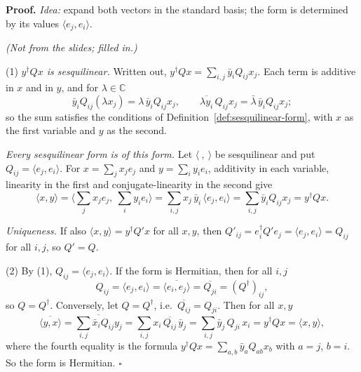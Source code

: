 \documentclass[11pt]{report}
\renewenvironment{proof}[1][Proof]{\noindent\textbf{#1.} }{\hfill$\square$\par\vspace{5pt}}
\begin{document}
\begin{proof}
\textit{Idea:} expand both vectors in the standard basis; the form is determined by its values $\langle e_j, e_i \rangle$.\par
\textit{(Not from the slides; filled in.)}

(1) \emph{$y^\dagger Q x$ is sesquilinear.} Written out, $y^\dagger Q x = \sum_{i,j} \bar y_i Q_{ij} x_j$. Each term is additive in $x$ and in $y$, and for $\lambda \in \mathbb{C}$
\[ \bar y_i Q_{ij} (\lambda x_j) = \lambda\, \bar y_i Q_{ij} x_j, \qquad \overline{\lambda y_i}\, Q_{ij} x_j = \bar\lambda\, \bar y_i Q_{ij} x_j; \]
so the sum satisfies the conditions of Definition~\ref{def:sesquilinear-form}, with $x$ as the first variable and $y$ as the second.

\emph{Every sesquilinear form is of this form.} Let $\langle\ ,\ \rangle$ be sesquilinear and put $Q_{ij} = \langle e_j, e_i \rangle$. For $x = \sum_j x_j e_j$ and $y = \sum_i y_i e_i$, additivity in each variable, linearity in the first and conjugate-linearity in the second give
\[ \langle x, y \rangle = \Big\langle \sum_j x_j e_j,\ \sum_i y_i e_i \Big\rangle = \sum_{i,j} x_j\, \bar y_i\, \langle e_j, e_i \rangle = \sum_{i,j} \bar y_i Q_{ij} x_j = y^\dagger Q x. \]

\emph{Uniqueness.} If also $\langle x, y \rangle = y^\dagger Q' x$ for all $x, y$, then $Q'_{ij} = e_i^\dagger Q' e_j = \langle e_j, e_i \rangle = Q_{ij}$ for all $i, j$, so $Q' = Q$.

(2) By (1), $Q_{ij} = \langle e_j, e_i \rangle$. If the form is Hermitian, then for all $i, j$
\[ Q_{ij} = \langle e_j, e_i \rangle = \overline{\langle e_i, e_j \rangle} = \overline{Q_{ji}} = (Q^\dagger)_{ij}, \]
so $Q = Q^\dagger$. Conversely, let $Q = Q^\dagger$, i.e.\ $\overline{Q_{ij}} = Q_{ji}$. Then for all $x, y$
\[ \overline{\langle y, x \rangle} = \overline{\sum_{i,j} \bar x_i Q_{ij} y_j} = \sum_{i,j} x_i\, \overline{Q_{ij}}\, \bar y_j = \sum_{i,j} \bar y_j\, Q_{ji}\, x_i = y^\dagger Q x = \langle x, y \rangle, \]
where the fourth equality is the formula $y^\dagger Q x = \sum_{a,b} \bar y_a Q_{ab} x_b$ with $a = j$, $b = i$. So the form is Hermitian.
\end{proof}
\end{document}
